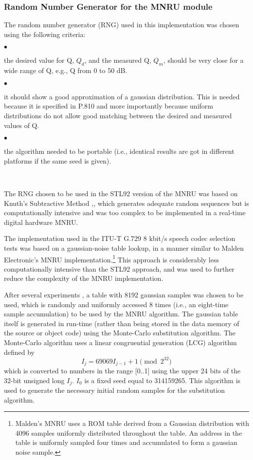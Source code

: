 \subsubsection{Random Number Generator for the MNRU module}

The random number generator (RNG) used in this implementation was
chosen using the following criteria:

\begin{minipage}{130mm}
 $\bullet$ \parbox[t]{120mm}{
               the desired value for Q, $Q_d$, and the measured Q,
               $Q_m$, should be very
               close for a wide range of Q, e.g., Q from 0 to 50 dB.
               \bigskip}

 $\bullet$ \parbox[t]{120mm}{
               it should show a good approximation of a gaussian
               distribution. This is needed because it is
               specified in P.810 and more importantly because uniform
               distributions do not allow good matching between the
               desired and measured values of Q. \bigskip}

 $\bullet$ \parbox[t]{120mm}{
               the algorithm needed to be portable (i.e., identical results
               are got in different platforms if the same seed is given).}\\
\end{minipage}

The RNG chosen to be used in the STL92 version of the MNRU was based
on Knuth's Subtractive Method \cite{Recipes},\cite[Parts
3.2--3.3]{Knuth}, which generates adequate random sequences but is
computationally intensive and was too complex to be implemented in a
real-time digital hardware MNRU.

The implementation used in the ITU-T G.729 8
kbit/s speech codec selection tests was based on a gaussian-noise
table lookup, in a manner similar to Malden Electronic's
MNRU implementation.\footnote{\SF Malden's MNRU uses a ROM table
derived from  a Gaussian distribution with 4096 samples uniformly
distributed throughout the table. An address in the table is
uniformly sampled four times and accumulated to form a gaussian noise
sample.} This approach is considerably less computationally intensive
than the STL92 approach, and was used to further reduce the
complexity of the MNRU implementation.

After several experiments \cite{Duo-MNRU}, a table with 8192 gaussian
samples was chosen to be used, which is randomly and uniformly
accessed 8 times (i.e., an eight-time sample accumulation) to be used
by the MNRU algorithm. The gaussian table itself is generated in
run-time (rather than being stored in the data memory of the source
or object code) using the Monte-Carlo substitution algorithm.
The Monte-Carlo algorithm uses a linear congruential generation (LCG)
algorithm defined by
\[
            I_{j} = 69069 I_{j-1} + 1 \pmod{2^{32}}
\]
which is converted to numbers in the range [0..1] using the upper 24
bits of the 32-bit unsigned long $I_j$. $I_0$ is a fixed seed equal to
314159265. This algorithm is used to generate the necessary initial random
samples for the substitution algorithm.

